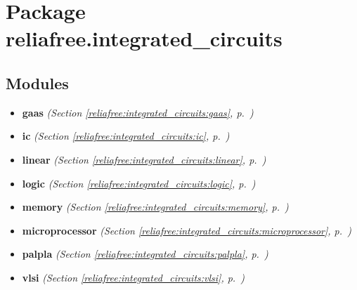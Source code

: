 %
%
%


\section{Package reliafree.integrated\_circuits}

    \label{reliafree:integrated_circuits}


\subsection{Modules}

\begin{itemize}
\setlength{\parskip}{0ex}
\item \textbf{gaas}
  \textit{(Section \ref{reliafree:integrated_circuits:gaas}, p.~\pageref{reliafree:integrated_circuits:gaas})}

\item \textbf{ic}
  \textit{(Section \ref{reliafree:integrated_circuits:ic}, p.~\pageref{reliafree:integrated_circuits:ic})}

\item \textbf{linear}
  \textit{(Section \ref{reliafree:integrated_circuits:linear}, p.~\pageref{reliafree:integrated_circuits:linear})}

\item \textbf{logic}
  \textit{(Section \ref{reliafree:integrated_circuits:logic}, p.~\pageref{reliafree:integrated_circuits:logic})}

\item \textbf{memory}
  \textit{(Section \ref{reliafree:integrated_circuits:memory}, p.~\pageref{reliafree:integrated_circuits:memory})}

\item \textbf{microprocessor}
  \textit{(Section \ref{reliafree:integrated_circuits:microprocessor}, p.~\pageref{reliafree:integrated_circuits:microprocessor})}

\item \textbf{palpla}
  \textit{(Section \ref{reliafree:integrated_circuits:palpla}, p.~\pageref{reliafree:integrated_circuits:palpla})}

\item \textbf{vlsi}
  \textit{(Section \ref{reliafree:integrated_circuits:vlsi}, p.~\pageref{reliafree:integrated_circuits:vlsi})}

\end{itemize}


